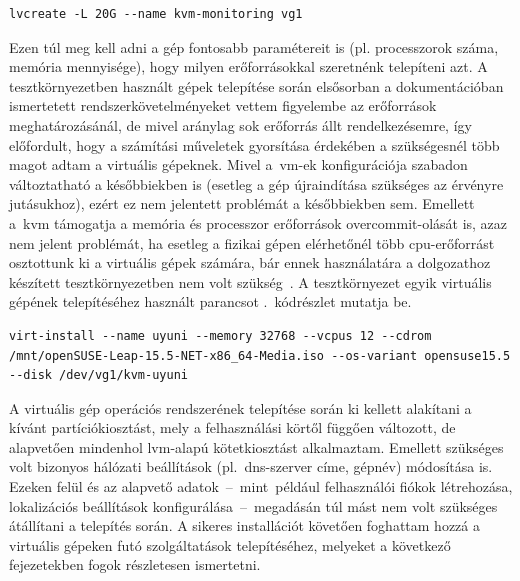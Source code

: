 \vspace{2mm}
\begin{lstlisting}[caption=Virtuális gépek logikai kötetének létrehozásához használt parancs.,label=lst:lvcreate]
	lvcreate -L 20G --name kvm-monitoring vg1
\end{lstlisting}

Ezen túl meg kell adni a gép fontosabb paramétereit is (pl. processzorok száma, memória mennyisége), hogy milyen erőforrásokkal szeretnénk telepíteni azt. A tesztkörnyezetben használt gépek telepítése során elsősorban a dokumentációban ismertetett rendszerkövetelményeket vettem figyelembe az erőforrások meghatározásánál, de mivel aránylag sok erőforrás állt rendelkezésemre, így előfordult, hogy a számítási műveletek gyorsítása érdekében a szükségesnél több magot adtam a virtuális gépeknek. Mivel a~\acrshort{vm}-ek konfigurációja szabadon változtatható a későbbiekben is (esetleg a gép újraindítása szükséges az érvényre jutásukhoz), ezért ez nem jelentett problémát a későbbiekben sem. Emellett a~\acrshort{kvm} támogatja a memória és processzor erőforrások \gls{overcommit}-olását is, azaz nem jelent problémát, ha esetleg a fizikai gépen elérhetőnél több \acrshort{cpu}-erőforrást osztottunk ki a virtuális gépek számára, bár ennek használatára a dolgozathoz készített tesztkörnyezetben nem volt szükség~\cite{RedHatKvmOvercommit}.
A tesztkörnyezet egyik virtuális gépének telepítéséhez használt parancsot .~kódrészlet mutatja be.

\vspace{2mm}
\begin{lstlisting}[caption=Virtuális gép telepítése a virt-install segédprogrammal.,label=lst:virtinstall]
	virt-install --name uyuni --memory 32768 --vcpus 12 --cdrom /mnt/openSUSE-Leap-15.5-NET-x86_64-Media.iso --os-variant opensuse15.5 --disk /dev/vg1/kvm-uyuni
\end{lstlisting}

A virtuális gép operációs rendszerének telepítése során ki kellett alakítani a kívánt partíciókiosztást, mely a felhasználási körtől függően változott, de alapvetően mindenhol \acrshort{lvm}-alapú kötetkiosztást alkalmaztam. Emellett szükséges volt bizonyos hálózati beállítások (pl.~\acrshort{dns}-szerver címe, gépnév) módosítása is. Ezeken felül és az alapvető adatok~--~mint~például felhasználói fiókok létrehozása, lokalizációs beállítások konfigurálása~--~megadásán túl mást nem volt szükséges átállítani a telepítés során. A sikeres installációt követően foghattam hozzá a virtuális gépeken futó szolgáltatások telepítéséhez, melyeket a következő fejezetekben fogok részletesen ismertetni.

